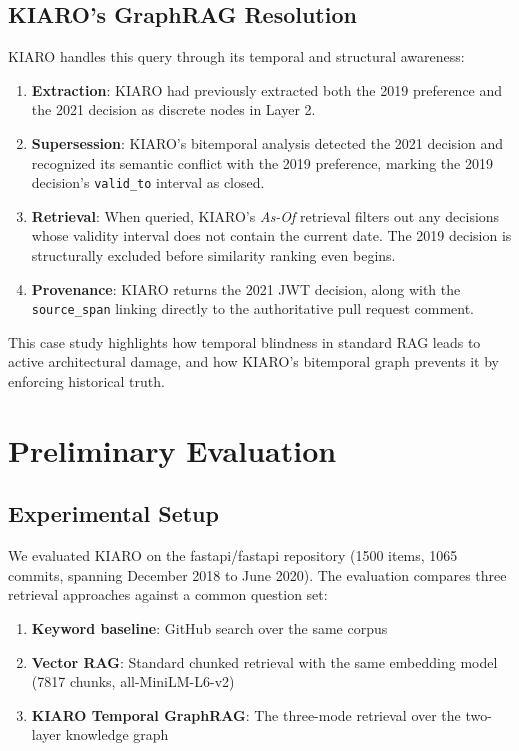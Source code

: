 \documentclass[conference]{IEEEtran}
\begin{document}
\subsection{KIARO's GraphRAG Resolution}
KIARO handles this query through its temporal and structural awareness:
\begin{enumerate}
    \item \textbf{Extraction}: KIARO had previously extracted both the 2019 preference and the 2021 decision as discrete nodes in Layer 2.
    \item \textbf{Supersession}: KIARO's bitemporal analysis detected the 2021 decision and recognized its semantic conflict with the 2019 preference, marking the 2019 decision's \texttt{valid\_to} interval as closed.
    \item \textbf{Retrieval}: When queried, KIARO's \emph{As-Of} retrieval filters out any decisions whose validity interval does not contain the current date. The 2019 decision is structurally excluded before similarity ranking even begins.
    \item \textbf{Provenance}: KIARO returns the 2021 JWT decision, along with the \texttt{source\_span} linking directly to the authoritative pull request comment.
\end{enumerate}

This case study highlights how temporal blindness in standard RAG leads to active architectural damage, and how KIARO's bitemporal graph prevents it by enforcing historical truth.

\section{Preliminary Evaluation}
\label{sec:evaluation}

\subsection{Experimental Setup}
We evaluated KIARO on the fastapi/fastapi repository (1500 items, 1065 commits, spanning December 2018 to June 2020). The evaluation compares three retrieval approaches against a common question set:
\begin{enumerate}
    \item \textbf{Keyword baseline}: GitHub search over the same corpus
    \item \textbf{Vector RAG}: Standard chunked retrieval with the same embedding model (7817 chunks, all-MiniLM-L6-v2)
    \item \textbf{KIARO Temporal GraphRAG}: The three-mode retrieval over the two-layer knowledge graph
\end{enumerate}
\end{document}
